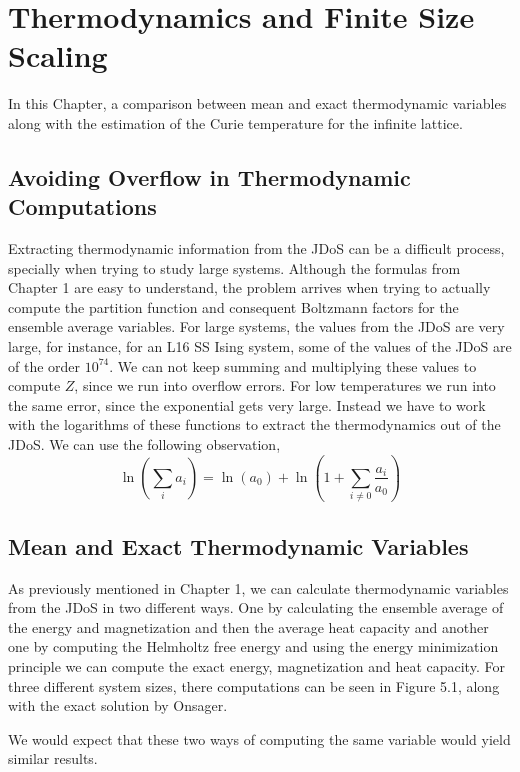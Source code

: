 \chapter{Thermodynamics and Finite Size Scaling}

	In this Chapter,  a comparison between mean and exact thermodynamic variables along with the estimation of the Curie temperature for the infinite lattice.

\section{Avoiding Overflow in Thermodynamic Computations}

	Extracting thermodynamic information from the JDoS can be a difficult process, specially when trying to study large systems. Although the formulas from Chapter 1 are easy to understand, the problem arrives when trying to actually compute the partition function and consequent Boltzmann factors for the ensemble average variables. For large systems, the values from the JDoS are very large, for instance, for an L16 SS Ising system, some of the values of the JDoS are of the order $10^{74}$. We can not keep summing and multiplying these values to compute $Z$, since we run into overflow errors. For low temperatures we run into the same error, since the exponential gets very large. Instead we have to work with the logarithms of these functions to extract the thermodynamics out of the JDoS. We can use the following observation,
\begin{equation}
	\ln \left(  \sum_i a_i \right) = \ln(a_0) + \ln\left( 1 + \sum_{i \neq 0} \frac{a_i}{a_0} \right)
\end{equation}

\section{Mean and Exact Thermodynamic Variables}

	As previously mentioned in Chapter 1, we can calculate thermodynamic variables from the JDoS in two different ways. One by calculating the ensemble average of the energy and magnetization and then the average heat capacity and another one by computing the Helmholtz free energy and using the energy minimization principle we can compute the exact energy, magnetization and heat capacity. For three different system sizes, there computations can be seen in Figure 5.1, along with the exact solution by Onsager. 
	
	We would expect that these two ways of computing the same variable would yield similar results. 

